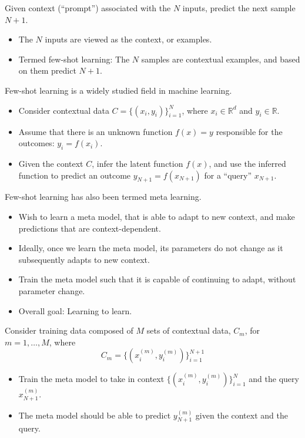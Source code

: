 \documentclass[12pt]{extarticle}
\begin{document}
Given context (``prompt'') associated with the $N$ inputs, predict the next sample $N+1$.

\begin{itemize}
    \item The $N$ inputs are viewed as the context, or examples.
    
    \item Termed few-shot learning: The $N$ samples are contextual examples, and based on them predict $N+1$.
\end{itemize}

Few-shot learning is a widely studied field in machine learning.

\begin{itemize}
    \item Consider contextual data $C = \{(x_i, y_i)\}_{i=1}^N$, where $x_i \in \mathbb{R}^d$ and $y_i \in \mathbb{R}$.
    
    \item Assume that there is an unknown function $f(x) = y$ responsible for the outcomes: $y_i = f(x_i)$.
    
    \item Given the context $C$, infer the latent function $f(x)$, and use the inferred function to predict an outcome $y_{N+1} = f(x_{N+1})$ for a ``query'' $x_{N+1}$.
\end{itemize}

Few-shot learning has also been termed meta learning.

\begin{itemize}
    \item Wish to learn a meta model, that is able to adapt to new context, and make predictions that are context-dependent.
    
    \item Ideally, once we learn the meta model, its parameters do not change as it subsequently adapts to new context.
    
    \item Train the meta model such that it is capable of continuing to adapt, without parameter change.
    
    \item Overall goal: Learning to learn.
\end{itemize}

Consider training data composed of $M$ sets of contextual data, $C_m$, for $m = 1, \ldots, M$, where
\[
C_m = \{(x_i^{(m)}, y_i^{(m)})\}_{i=1}^{N+1}
\]

\begin{itemize}
    \item Train the meta model to take in context $\{(x_i^{(m)}, y_i^{(m)})\}_{i=1}^{N}$ and the query $x_{N+1}^{(m)}$.
    
    \item The meta model should be able to predict $y_{N+1}^{(m)}$ given the context and the query.
\end{itemize}
\end{document}
